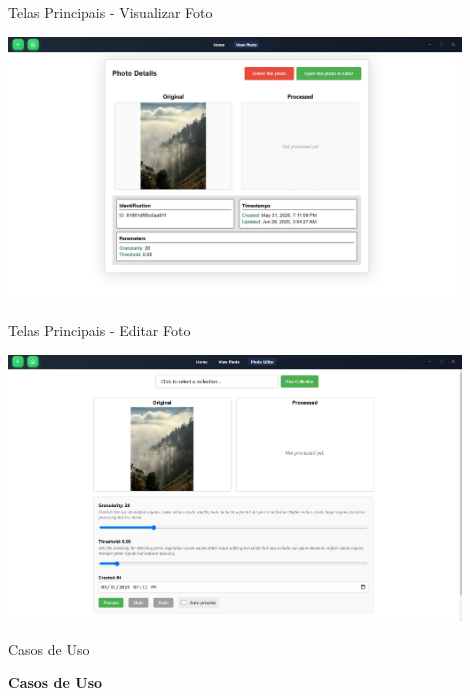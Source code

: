 \documentclass[landscape, 12pt]{beamer}
\begin{document}
\begin{frame}{Telas Principais - Visualizar Foto}
    \begin{center}
        \includegraphics[width=0.9\textwidth]{../figures/hci/view_photo.png}
    \end{center}
\end{frame}

\begin{frame}{Telas Principais - Editar Foto}
    \begin{center}
        \includegraphics[width=0.9\textwidth]{../figures/hci/photo_editor.png}
    \end{center}
\end{frame}

\begin{frame}{Casos de Uso}
    \begin{center}
        \textbf{Casos de Uso}
    \end{center}
\end{frame}
\end{document}
